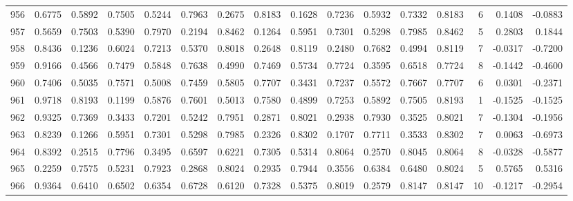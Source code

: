 \begin{tabular}{lrrrrrrrrrrrrrrr}
956 &      0.6775 &  0.5892 &  0.7505 &  0.5244 &  0.7963 &  0.2675 &  0.8183 &  0.1628 &  0.7236 &  0.5932 &   0.7332 &     0.8183 &      6 &                    0.1408 &                    -0.0883 \\
957 &      0.5659 &  0.7503 &  0.5390 &  0.7970 &  0.2194 &  0.8462 &  0.1264 &  0.5951 &  0.7301 &  0.5298 &   0.7985 &     0.8462 &      5 &                    0.2803 &                     0.1844 \\
958 &      0.8436 &  0.1236 &  0.6024 &  0.7213 &  0.5370 &  0.8018 &  0.2648 &  0.8119 &  0.2480 &  0.7682 &   0.4994 &     0.8119 &      7 &                   -0.0317 &                    -0.7200 \\
959 &      0.9166 &  0.4566 &  0.7479 &  0.5848 &  0.7638 &  0.4990 &  0.7469 &  0.5734 &  0.7724 &  0.3595 &   0.6518 &     0.7724 &      8 &                   -0.1442 &                    -0.4600 \\
960 &      0.7406 &  0.5035 &  0.7571 &  0.5008 &  0.7459 &  0.5805 &  0.7707 &  0.3431 &  0.7237 &  0.5572 &   0.7667 &     0.7707 &      6 &                    0.0301 &                    -0.2371 \\
961 &      0.9718 &  0.8193 &  0.1199 &  0.5876 &  0.7601 &  0.5013 &  0.7580 &  0.4899 &  0.7253 &  0.5892 &   0.7505 &     0.8193 &      1 &                   -0.1525 &                    -0.1525 \\
962 &      0.9325 &  0.7369 &  0.3433 &  0.7201 &  0.5242 &  0.7951 &  0.2871 &  0.8021 &  0.2938 &  0.7930 &   0.3525 &     0.8021 &      7 &                   -0.1304 &                    -0.1956 \\
963 &      0.8239 &  0.1266 &  0.5951 &  0.7301 &  0.5298 &  0.7985 &  0.2326 &  0.8302 &  0.1707 &  0.7711 &   0.3533 &     0.8302 &      7 &                    0.0063 &                    -0.6973 \\
964 &      0.8392 &  0.2515 &  0.7796 &  0.3495 &  0.6597 &  0.6221 &  0.7305 &  0.5314 &  0.8064 &  0.2570 &   0.8045 &     0.8064 &      8 &                   -0.0328 &                    -0.5877 \\
965 &      0.2259 &  0.7575 &  0.5231 &  0.7923 &  0.2868 &  0.8024 &  0.2935 &  0.7944 &  0.3556 &  0.6384 &   0.6480 &     0.8024 &      5 &                    0.5765 &                     0.5316 \\
966 &      0.9364 &  0.6410 &  0.6502 &  0.6354 &  0.6728 &  0.6120 &  0.7328 &  0.5375 &  0.8019 &  0.2579 &   0.8147 &     0.8147 &     10 &                   -0.1217 &                    -0.2954 \\

\end{tabular}
